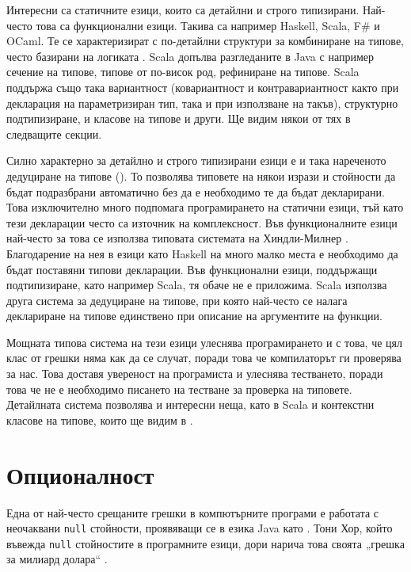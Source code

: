 Интересни са статичните езици, които са детайлни и строго типизирани. Най-често това са функционални езици. Такива са например Haskell, Scala, F\# и OCaml. Те се характеризират с по-детайлни структури за комбиниране на типове, често базирани на логиката \cite{odersky2013Types}. Scala допълва разгледаните в Java с например сечение на типове, типове от по-висок род, рефиниране на типове. Scala поддържа също така вариантност (ковариантност и контравариантност както при декларация на параметризиран тип, така и при използване на такъв), структурно подтипизиране,  и класове на типове и други. Ще видим някои от тях в следващите секции.

Силно характерно за детайлно и строго типизирани езици е и така нареченото дедуциране на типове (). То позволява типовете на някои изрази и стойности да бъдат подразбрани автоматично без да е необходимо те да бъдат декларирани. Това изключително много подпомага програмирането на статични езици, тъй като тези декларации често са източник на комплексност. Във функционалните езици най-често за това се използва типовата системата на Хиндли-Милнер \cite{hindley1969, milner1978}. Благодарение на нея в езици като Haskell на много малко места е необходимо да бъдат поставяни типови декларации. Във функционални езици, поддържащи подтипизиране, като например Scala, тя обаче не е приложима. Scala използва друга система за дедуциране на типове, при която най-често се налага деклариране на типове единствено при описание на аргументите на функции.

Мощната типова система на тези езици улеснява програмирането и с това, че цял клас от грешки няма как да се случат, поради това че компилаторът ги проверява за нас. Това доставя увереност на програмиста и улеснява тестването, поради това че не е необходимо писането на тестване за проверка на типовете. Детайлната система позволява и интересни неща, като  в Scala и контекстни класове на типове, които ще видим в .

\section{Опционалност}
\label{sec:optionallity}

Една от най-често срещаните грешки в компютърните програми е работата с неочаквани \lstinline{null} стойности, проявяващи се в езика Java като . Тони Хор, който въвежда \lstinline{null} стойностите в програмните езици, дори нарича това своята „грешка за милиард долара“ \cite{hoare2009Null}.

